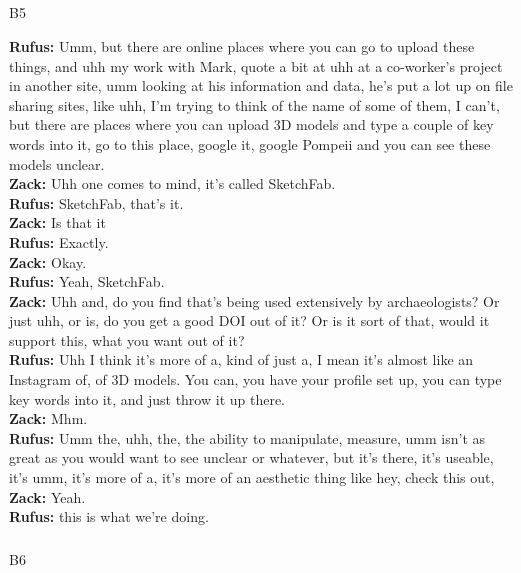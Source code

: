 \documentclass[
]{article}
\makeatletter
\let\oldsubparagraph\subparagraph
\renewcommand{\subparagraph}{
    \@ifstar
      \xxxSubParagraphStar
      \xxxSubParagraphNoStar
  }
\newcommand{\xxxSubParagraphStar}[1]{\oldsubparagraph*{#1}\mbox{}}
\newcommand{\xxxSubParagraphNoStar}[1]{\oldsubparagraph{#1}\mbox{}}
\makeatother
\begin{document}
\subparagraph{B5}\label{sec-B5}

\textbf{Rufus:} Umm, but there are online places where you can go to
upload these things, and uhh my work with Mark, quote a bit at uhh at a
co-worker's project in another site, umm looking at his information and
data, he's put a lot up on file sharing sites, like uhh, I'm trying to
think of the name of some of them, I can't, but there are places where
you can upload 3D models and type a couple of key words into it, go to
this place, google it, google Pompeii and you can see these models
unclear.\\
\textbf{Zack:} Uhh one comes to mind, it's called SketchFab.\\
\textbf{Rufus:} SketchFab, that's it.\\
\textbf{Zack:} Is that it\\
\textbf{Rufus:} Exactly.\\
\textbf{Zack:} Okay.\\
\textbf{Rufus:} Yeah, SketchFab.\\
\textbf{Zack:} Uhh and, do you find that's being used extensively by
archaeologists? Or just uhh, or is, do you get a good DOI out of it? Or
is it sort of that, would it support this, what you want out of it?\\
\textbf{Rufus:} Uhh I think it's more of a, kind of just a, I mean it's
almost like an Instagram of, of 3D models. You can, you have your
profile set up, you can type key words into it, and just throw it up
there.\\
\textbf{Zack:} Mhm.\\
\textbf{Rufus:} Umm the, uhh, the, the ability to manipulate, measure,
umm isn't as great as you would want to see unclear or whatever, but
it's there, it's useable, it's umm, it's more of a, it's more of an
aesthetic thing like hey, check this out,\\
\textbf{Zack:} Yeah.\\
\textbf{Rufus:} this is what we're doing.

\subparagraph{B6}\label{sec-B6}
\end{document}
